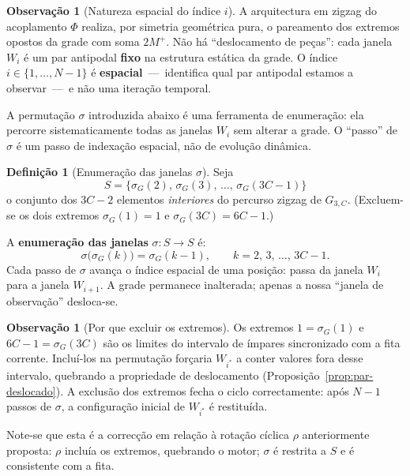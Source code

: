 \documentclass[12pt, a4paper]{article}
\theoremstyle{plain}
\theoremstyle{definition}
\newtheorem{definition}[theorem]{Definição}
\newtheorem{remark}[theorem]{Observação}
\theoremstyle{remark}
\begin{document}
	\begin{remark}[Natureza espacial do índice $i$]
		\label{rem:espacial}
		A arquitectura em zigzag do acoplamento $\Phi$ realiza, por
		simetria geométrica pura, o pareamento dos extremos opostos da
		grade com soma $2M^+$.  Não há ``deslocamento de peças'': cada
		janela $W_i$ é um par antipodal \textbf{fixo} na estrutura estática
		da grade.  O índice $i \in \{1,\ldots,N-1\}$ é
		\textbf{espacial}~---~identifica qual par antipodal estamos a
		observar~---~e não uma iteração temporal.
		
		A permutação $\sigma$ introduzida abaixo é uma ferramenta de
		enumeração: ela percorre sistematicamente todas as janelas $W_i$
		sem alterar a grade.  O ``passo'' de $\sigma$ é um passo de
		indexação espacial, não de evolução dinâmica.
	\end{remark}
	
	\begin{definition}[Enumeração das janelas $\sigma$]
		\label{def:sigma}
		Seja
		\[
		S = \bigl\{\sigma_G(2),\,\sigma_G(3),\,\ldots,\,
		\sigma_G(3C-1)\bigr\}
		\]
		o conjunto dos $3C-2$ elementos \emph{interiores} do percurso
		zigzag de $G_{3,C}$.  (Excluem-se os dois extremos
		$\sigma_G(1)=1$ e $\sigma_G(3C)=6C-1$.)
		
		A \textbf{enumeração das janelas} $\sigma:S\to S$ é:
		\[
		\sigma\bigl(\sigma_G(k)\bigr) = \sigma_G(k-1),
		\qquad k = 2,\,3,\,\ldots,\,3C-1.
		\]
		Cada passo de $\sigma$ avança o índice espacial de uma posição:
		passa da janela $W_i$ para a janela $W_{i+1}$.  A grade
		permanece inalterada; apenas a nossa ``janela de observação''
		desloca-se.
	\end{definition}
	
	\begin{remark}[Por que excluir os extremos]
		\label{rem:extremos}
		Os extremos $1=\sigma_G(1)$ e $6C-1=\sigma_G(3C)$ são os limites
		do intervalo de ímpares sincronizado com a fita corrente.
		Incluí-los na permutação forçaria $W_{i^*}$ a conter valores fora
		desse intervalo, quebrando a propriedade de deslocamento
		(Proposição~\ref{prop:par-deslocado}).  A exclusão dos extremos
		fecha o ciclo correctamente: após $N-1$ passos de $\sigma$, a
		configuração inicial de $W_{i^*}$ é restituída.
		
		Note-se que esta é a correcção em relação à rotação cíclica $\rho$
		anteriormente proposta: $\rho$ incluía os extremos, quebrando o
		motor; $\sigma$ é restrita a $S$ e é consistente com a fita.
	\end{remark}
	
\end{document}
